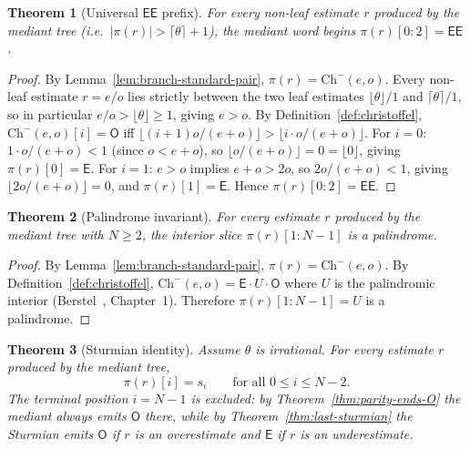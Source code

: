 \documentclass[12pt]{article}
\newtheorem{theorem}{Theorem}[section]
\theoremstyle{definition}
\theoremstyle{remark}
\theoremstyle{plain}
\newcommand{\OO}{\mathsf{O}}
\newcommand{\EE}{\mathsf{E}}
\begin{document}
\begin{theorem}[Universal $\EE\EE$ prefix]
\label{prop:EE-prefix}
For every non-leaf estimate $r$ produced by the mediant tree (i.e.\ $|\pi(r)| > \lceil\theta\rceil + 1$),
the mediant word begins $\pi(r)[0{:}2] = \EE\EE$.
\end{theorem}

\begin{proof}
By Lemma~\ref{lem:branch-standard-pair}, $\pi(r) = \mathrm{Ch}^-(e, o)$.
Every non-leaf estimate $r = e/o$ lies strictly between the two leaf estimates
$\lfloor\theta\rfloor/1$ and $\lceil\theta\rceil/1$, so in particular $e/o > \lfloor\theta\rfloor \geq 1$,
giving $e > o$.
By Definition~\ref{def:christoffel}, $\mathrm{Ch}^-(e,o)[i] = \OO$ iff
$\lfloor(i+1)o/(e+o)\rfloor > \lfloor i\cdot o/(e+o)\rfloor$.
For $i = 0$: $1 \cdot o/(e+o) < 1$ (since $o < e+o$), so
$\lfloor o/(e+o)\rfloor = 0 = \lfloor 0\rfloor$, giving $\pi(r)[0] = \EE$.
For $i = 1$: $e > o$ implies $e+o > 2o$, so $2o/(e+o) < 1$, giving
$\lfloor 2o/(e+o)\rfloor = 0$, and $\pi(r)[1] = \EE$.
Hence $\pi(r)[0{:}2] = \EE\EE$.
\end{proof}

\begin{theorem}[Palindrome invariant]
\label{prop:palindrome}
For every estimate $r$ produced by the mediant tree with $N \geq 2$,
the interior slice $\pi(r)[1{:}N{-}1]$ is a palindrome.
\end{theorem}

\begin{proof}
By Lemma~\ref{lem:branch-standard-pair}, $\pi(r) = \mathrm{Ch}^-(e, o)$.
By Definition~\ref{def:christoffel}, $\mathrm{Ch}^-(e,o) = \EE \cdot U \cdot \OO$ where
$U$ is the palindromic interior (Berstel~\cite{berstel2009}, Chapter~1).
Therefore $\pi(r)[1{:}N{-}1] = U$ is a palindrome.
\end{proof}

\begin{theorem}[Sturmian identity]
\label{prop:sturmian}
Assume $\theta$ is irrational.
For every estimate $r$ produced by the mediant tree,
\[
  \pi(r)[i] = s_i \qquad \text{for all } 0 \leq i \leq N-2.
\]
The terminal position $i = N-1$ is excluded: by Theorem~\ref{thm:parity-ends-O}
the mediant always emits $\OO$ there, while by Theorem~\ref{thm:last-sturmian}
the Sturmian emits $\OO$ if $r$ is an overestimate and $\EE$ if $r$ is an underestimate.
\end{theorem}
\end{document}
